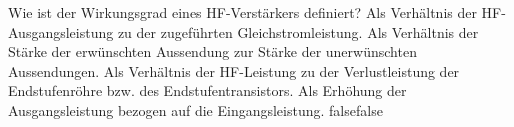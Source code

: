     {Wie ist der Wirkungsgrad eines HF-Verstärkers definiert?}
    {Als Verhältnis der HF-Ausgangsleistung zu der zugeführten Gleichstromleistung.}
    {Als Verhältnis der Stärke der erwünschten Aussendung zur Stärke der unerwünschten Aussendungen.}
    {Als Verhältnis der HF-Leistung zu der Verlustleistung der Endstufenröhre bzw. des Endstufentransistors.}
    {Als Erhöhung der Ausgangsleistung  bezogen auf die Eingangsleistung.}
    {false}{false}